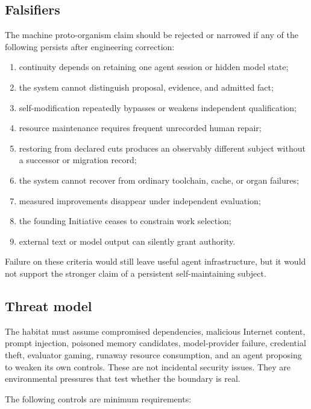 \subsection{Falsifiers}

The machine proto-organism claim should be rejected or narrowed if any of the
following persists after engineering correction:

\begin{enumerate}[leftmargin=*]
  \item continuity depends on retaining one agent session or hidden model
  state;
  \item the system cannot distinguish proposal, evidence, and admitted fact;
  \item self-modification repeatedly bypasses or weakens independent
  qualification;
  \item resource maintenance requires frequent unrecorded human repair;
  \item restoring from declared cuts produces an observably different subject
  without a successor or migration record;
  \item the system cannot recover from ordinary toolchain, cache, or organ
  failures;
  \item measured improvements disappear under independent evaluation;
  \item the founding Initiative ceases to constrain work selection;
  \item external text or model output can silently grant authority.
\end{enumerate}

Failure on these criteria would still leave useful agent infrastructure, but
it would not support the stronger claim of a persistent self-maintaining
subject.

\subsection{Threat model}

The habitat must assume compromised dependencies, malicious Internet content,
prompt injection, poisoned memory candidates, model-provider failure,
credential theft, evaluator gaming, runaway resource consumption, and an
agent proposing to weaken its own controls. These are not incidental security
issues. They are environmental pressures that test whether the boundary is
real.

The following controls are minimum requirements:


